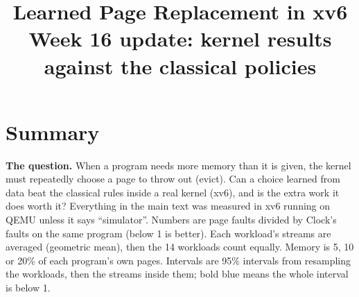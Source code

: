 \documentclass[10.5pt,a4paper]{article}
\title{\textbf{Learned Page Replacement in xv6}\\[2pt]
\large Week 16 update: kernel results against the classical policies}
\author{}
\date{}
\begin{document}
\maketitle
\vspace{-2em}

\section*{Summary}

\textbf{The question.} When a program needs more memory than it is given, the kernel must repeatedly choose a page to throw out (evict). Can a choice learned from data beat
the classical rules inside a real kernel (xv6), and is the extra work it does worth it? Everything in the main text was measured in xv6 running on QEMU unless it says ``simulator''.
Numbers are page faults divided by Clock's faults on the same program (below 1 is better). Each workload's streams are averaged (geometric mean), then the 14 workloads count equally.
Memory is 5, 10 or 20\% of each program's own pages. Intervals are 95\% intervals from resampling the workloads, then the streams inside them; bold blue means the whole interval is below 1.
\end{document}
